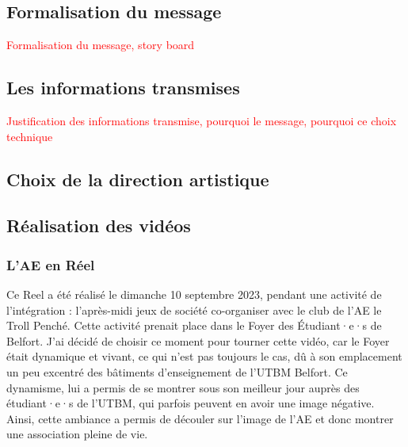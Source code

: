 
\subsection{Formalisation du message}

\textcolor{red}{Formalisation du message, story board}



\subsection{Les informations transmises}

\textcolor{red}{Justification des informations transmise, pourquoi le message, pourquoi ce choix technique}


\subsection{Choix de la direction artistique}\label{subsec:choix-de-la-direction-artistique}







\subsection{Réalisation des vidéos}\label{subsec:realisation-des-videos}

\subsubsection{L'\gls{AE} en Réel}\label{subsubsec:ae-en-reel}

Ce Reel a été réalisé le dimanche 10 septembre 2023, pendant une activité de l'intégration : l'après-midi jeux de société co-organiser avec le club de l'\gls{AE} le Troll Penché.
Cette activité prenait place dans le Foyer des Étudiant·e·s de Belfort.
J'ai décidé de choisir ce moment pour tourner cette vidéo, car le Foyer était dynamique et vivant, ce qui n'est pas toujours le cas, dû à son emplacement un peu excentré des bâtiments d'enseignement de l'\gls{UTBM} Belfort.
Ce dynamisme, lui a permis de se montrer sous son meilleur jour auprès des étudiant·e·s de l'\gls{UTBM}, qui parfois peuvent en avoir une image négative.
Ainsi, cette ambiance a permis de découler sur l'image de l'\gls{AE} et donc montrer une association pleine de vie.


